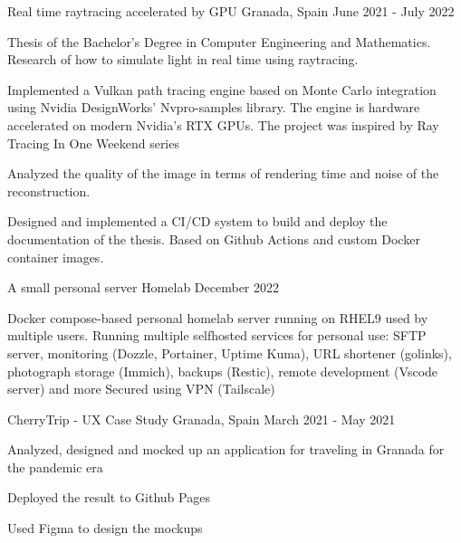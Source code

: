 
\begin{cventries}
    \cventry
      {}
      {Real time raytracing accelerated by GPU}
      {Granada, Spain}
      {June 2021 - July 2022}
      {
        \begin{cvitems} %
          \item {Thesis of the Bachelor's Degree in Computer Engineering and Mathematics. Research of how to simulate light in real time using raytracing.}
          \item {Implemented a Vulkan path tracing engine based on Monte Carlo integration using Nvidia DesignWorks' Nvpro-samples library. The engine is hardware accelerated on modern Nvidia's RTX GPUs. The project was inspired by Ray Tracing In One Weekend series}
          \item {Analyzed the quality of the image in terms of rendering time and noise of the reconstruction.}
          \item {Designed and implemented a CI/CD system to build and deploy the documentation of the thesis. Based on Github Actions and custom Docker container images.}
        \end{cvitems}
      }

    \cventry
        {A small personal server}
        {Homelab}
        {}
        {December 2022}
        {
          \begin{cvitems} %
            {Docker compose-based personal homelab server running on RHEL9 used by multiple users.}
            {Running multiple selfhosted services for personal use: SFTP server, monitoring (Dozzle, Portainer, Uptime Kuma), URL shortener (golinks), photograph storage (Immich), backups (Restic), remote development (Vscode server) and more}
            {Secured using VPN (Tailscale)}
          \end{cvitems}
        }

    \cventry
      {}
      {CherryTrip - UX Case Study}
      {Granada, Spain}
      {March 2021 - May 2021}
      {
        \begin{cvitems} %
          \item {Analyzed, designed and mocked up an application for traveling in Granada for the pandemic era }
          \item {Deployed the result to Github Pages}
          \item {Used Figma to design the mockups}
        \end{cvitems}
      }


\end{cventries}
